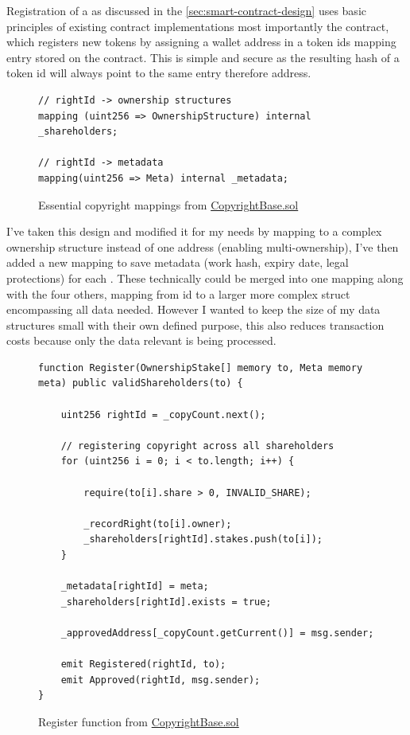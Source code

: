 Registration of a  as discussed in the \ref{sec:smart-contract-design} uses basic principles of existing contract implementations most importantly the \nft contract, which registers new tokens by assigning a wallet address in a token ids mapping entry stored on the contract. This is simple and secure as the resulting hash of a token id will always point to the same entry therefore address.

\begin{figure}[H]
\caption{Essential copyright mappings from \href{https://github.com/MrHarrisonBarker/CRPL/blob/main/CRPL.Contracts/contracts/Copyrights/CopyrightBase.sol}{CopyrightBase.sol}}
\centering
\begin{lstlisting}[language=Solidity]
// rightId -> ownership structures
mapping (uint256 => OwnershipStructure) internal _shareholders;
    
// rightId -> metadata
mapping(uint256 => Meta) internal _metadata;
\end{lstlisting}
\end{figure}

I've taken this design and modified it for my needs by mapping to a complex ownership structure instead of one address (enabling multi-ownership), I've then added a new mapping to save metadata (work hash, expiry date, legal protections) for each . These technically could be merged into one mapping along with the four others, mapping from id to a larger more complex struct encompassing all data needed. However I wanted to keep the size of my data structures small with their own defined purpose, this also reduces transaction costs because only the data relevant is being processed.

\begin{figure}[H]
\caption{Register function from \href{https://github.com/MrHarrisonBarker/CRPL/blob/main/CRPL.Contracts/contracts/Copyrights/CopyrightBase.sol}{CopyrightBase.sol}}
\centering
\begin{lstlisting}[language=Solidity]
function Register(OwnershipStake[] memory to, Meta memory meta) public validShareholders(to) {
	
	uint256 rightId = _copyCount.next();

	// registering copyright across all shareholders
	for (uint256 i = 0; i < to.length; i++) {

		require(to[i].share > 0, INVALID_SHARE);

		_recordRight(to[i].owner);
		_shareholders[rightId].stakes.push(to[i]);
	}
        
	_metadata[rightId] = meta;
	_shareholders[rightId].exists = true;
        
	_approvedAddress[_copyCount.getCurrent()] = msg.sender;

	emit Registered(rightId, to);
	emit Approved(rightId, msg.sender);
}	
\end{lstlisting}
\end{figure}

